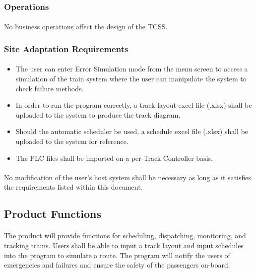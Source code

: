 \documentclass{article}
\begin{document}
    \subsubsection{Operations}
    \paragraph{}
    No business operations affect the design of the TCSS.
    

    \subsubsection{Site Adaptation Requirements}
    \paragraph{}
    \begin{itemize}
        \item The user can enter Error Simulation mode from the menu screen to access a simulation of the train system where the user can manipulate the system to check failure methods.
        \item In order to run the program correctly, a track layout excel file (.xlsx) shall be uploaded to the system to produce the track diagram. 
        \item Should the automatic scheduler be used, a schedule excel file (.xlsx) shall be uploaded to the system for reference.
        \item The PLC  files shall be imported on a per-Track Controller  basis.
    \end{itemize}
    
    \paragraph{}
    No modification of the user's host system shall be necessary as long as it satisfies the requirements listed within this document.
    
    \subsection{Product Functions}
    \paragraph{}
    The product will provide functions for scheduling, dispatching, monitoring, and tracking trains. Users shall be able to input a track layout and input schedules into the program to simulate a route. The program will notify the users of emergencies and failures and ensure the safety of the passengers on-board. 
\end{document}
